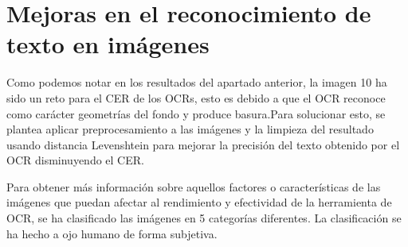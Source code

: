 \section{Mejoras en el reconocimiento de texto en imágenes}
\label{sec:Mejoras en el reconocimiento}
Como podemos notar en los resultados del apartado anterior, la imagen 10 ha sido un reto para el CER de los OCRs, esto es debido a que el OCR reconoce como carácter geometrías del fondo y produce basura.Para solucionar esto, se plantea aplicar preprocesamiento a las imágenes y la limpieza del resultado usando distancia Levenshtein para mejorar la precisión del texto obtenido por el OCR disminuyendo el CER.

Para obtener más información sobre aquellos factores o características de las imágenes que puedan afectar al rendimiento y efectividad de la herramienta de OCR, se ha clasificado las imágenes en 5 categorías diferentes. La clasificación se ha hecho a ojo humano de forma subjetiva.
